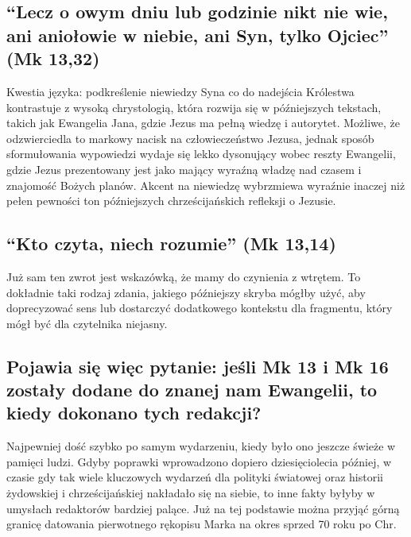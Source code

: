 \subsection{``Lecz o owym dniu lub godzinie nikt nie wie, ani aniołowie w niebie, ani Syn, tylko Ojciec'' (Mk 13,32)}\label{subsec:but-concerning-that-day-or-that-hour-no-one-knows-not-even-the-angels-in-heaven-nor-the-son-but-only-the-father-mark-1332}

Kwestia języka: podkreślenie niewiedzy Syna co do nadejścia Królestwa kontrastuje z wysoką chrystologią, która rozwija się w późniejszych tekstach, takich jak Ewangelia Jana, gdzie Jezus ma pełną wiedzę i autorytet.
Możliwe, że odzwierciedla to markowy nacisk na człowieczeństwo Jezusa, jednak sposób sformułowania wypowiedzi wydaje się lekko dysonujący wobec reszty Ewangelii, gdzie Jezus prezentowany jest jako mający wyraźną władzę nad czasem i znajomość Bożych planów.
Akcent na niewiedzę wybrzmiewa wyraźnie inaczej niż pełen pewności ton późniejszych chrześcijańskich refleksji o Jezusie.

\subsection{``Kto czyta, niech rozumie'' (Mk 13,14)}\label{subsec:let-the-reader-understand-mark-1314}

Już sam ten zwrot jest wskazówką, że mamy do czynienia z wtrętem.
To dokładnie taki rodzaj zdania, jakiego późniejszy skryba mógłby użyć, aby doprecyzować sens lub dostarczyć dodatkowego kontekstu dla fragmentu, który mógł być dla czytelnika niejasny.

\subsection{Pojawia się więc pytanie: jeśli Mk 13 i Mk 16 zostały dodane do znanej nam Ewangelii, to kiedy dokonano tych redakcji?}\label{subsec:now-the-question-is-if-mark-13-and-mark-16-were-added-to-the-gospel-known-to-us-then-when-would-the-edits-have-been-made}

Najpewniej dość szybko po samym wydarzeniu, kiedy było ono jeszcze świeże w pamięci ludzi.
Gdyby poprawki wprowadzono dopiero dziesięciolecia później, w czasie gdy tak wiele kluczowych wydarzeń dla polityki światowej oraz historii żydowskiej i chrześcijańskiej nakładało się na siebie, to inne fakty byłyby w umysłach redaktorów bardziej palące.
Już na tej podstawie można przyjąć górną granicę datowania pierwotnego rękopisu Marka na okres sprzed 70 roku po Chr.

